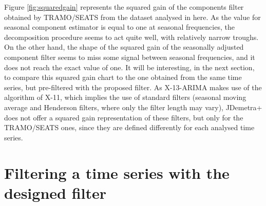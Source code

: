 \documentclass[english,blauw]{cbsdiscussionpaper}
\begin{document}
Figure \ref{fig:squaredgain} represents the squared gain of the components filter obtained by TRAMO/SEATS from the dataset analysed in here. As the value for seasonal component estimator is equal to one at seasonal frequencies, the decomposition procedure seems to act quite well, with relatively narrow troughs. On the other hand, the shape of the squared gain of the seasonally adjusted component filter seems to miss some signal between seasonal frequencies, and it does not reach the exact value of one. It will be interesting, in the next section, to compare this squared gain chart to the one obtained from the same time series, but pre-filtered with the proposed filter.
As X-13-ARIMA makes use of the algorithm of X-11, which implies the use of standard filters (seasonal moving average and Henderson filters, where only the filter length may vary), JDemetra+ does not offer a squared gain representation of these filters, but only for the TRAMO/SEATS ones, since they are defined differently for each analysed time series.
\section{Filtering a time series with the designed filter}
\end{document}
